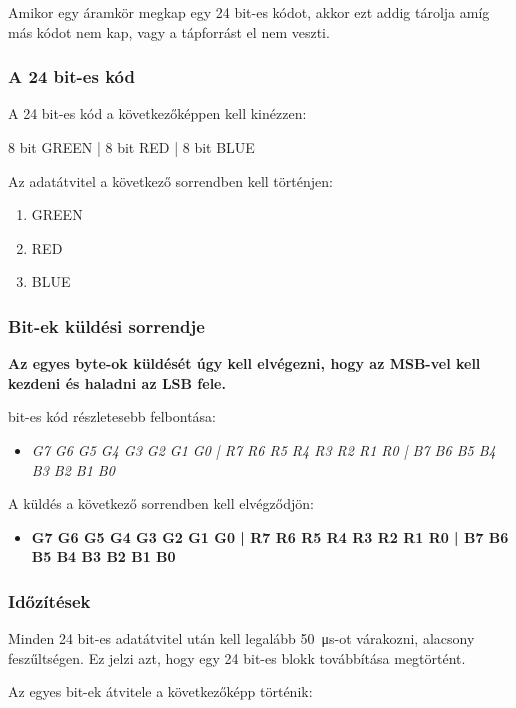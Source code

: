 \documentclass[10pt]{article} %
\begin{document}
Amikor egy áramkör megkap egy 24 bit-es kódot, akkor ezt addig tárolja amíg más kódot nem kap, vagy a tápforrást el nem veszti.

\subsubsection{A 24 bit-es kód}

A 24 bit-es kód a következőképpen kell kinézzen:

8 bit GREEN | 8 bit RED | 8 bit BLUE

Az adatátvitel a következő sorrendben kell történjen: 
\begin{enumerate}
	\item GREEN
	\item RED
	\item BLUE
\end{enumerate}

\subsubsection{Bit-ek küldési sorrendje}

\textbf{Az egyes byte-ok küldését úgy kell elvégezni, hogy az MSB-vel kell kezdeni és haladni az LSB fele.}

 bit-es kód részletesebb felbontása: 
\begin{itemize}
\item \textit{G7 G6 G5 G4 G3 G2 G1 G0 | R7 R6 R5 R4 R3 R2 R1 R0 | B7 B6 B5 B4 B3 B2 B1 B0}
\end{itemize}

\noindent A küldés a következő sorrendben kell elvégződjön: 
\begin{itemize}
\item \textbf{G7 G6 G5 G4 G3 G2 G1 G0 | R7 R6 R5 R4 R3 R2 R1 R0 | B7 B6 B5 B4 B3 B2 B1 B0}
\end{itemize}

\subsubsection{Időzítések}

Minden 24 bit-es adatátvitel után kell legalább \SI{50}{\micro\second}-ot várakozni, alacsony feszűltségen. Ez jelzi azt, hogy egy 24 bit-es blokk továbbítása megtörtént.

\noindent Az egyes bit-ek átvitele a következőképp történik:
\end{document}
